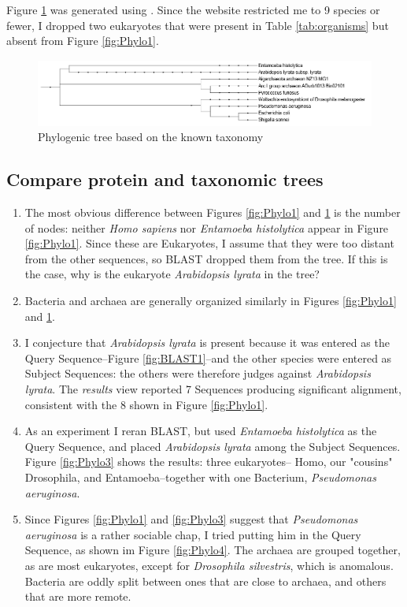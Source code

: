 \documentclass[]{article}
\begin{document}
Figure \ref{fig:Phylo2} was generated using \cite{biobyte2019phylot}. Since the website restricted me to 9 species or fewer, I dropped two eukaryotes that were present in Table \ref{tab:organisms} but absent from Figure \ref{fig:Phylo1}.

\begin{figure}[H]
	\caption{Phylogenic tree based on the known taxonomy}\label{fig:Phylo2}
	\includegraphics[width=\textwidth]{Phylo2}
\end{figure}

\subsection{Compare protein and taxonomic trees}\label{sect:compare}

\begin{enumerate}
	\item The most obvious difference between Figures \ref{fig:Phylo1} and  \ref{fig:Phylo2} is the number of nodes: neither \textit{Homo sapiens} nor \textit{Entamoeba histolytica} appear in Figure \ref{fig:Phylo1}. Since these are Eukaryotes, I assume that they were too distant from the other sequences, so BLAST dropped them from the tree. If this is the case, why is the eukaryote \textit{Arabidopsis lyrata} in the tree?
	\item Bacteria and archaea are generally organized similarly in  Figures \ref{fig:Phylo1} and  \ref{fig:Phylo2}.
	\item I conjecture that \textit{Arabidopsis lyrata} is present because it was entered as the Query Sequence--Figure \ref{fig:BLAST1}--and the other species were entered as Subject Sequences: the others were therefore judges against \textit{Arabidopsis lyrata}. The \textit{results} view reported 7 Sequences producing significant alignment, consistent with the 8 shown in Figure \ref{fig:Phylo1}.
	\item As an experiment I reran BLAST, but used \textit{Entamoeba histolytica } as the Query Sequence, and placed \textit{Arabidopsis lyrata} among the Subject Sequences. Figure \ref{fig:Phylo3} shows the results: three eukaryotes-- Homo, our "cousins" Drosophila, and Entamoeba--together with one Bacterium, \textit{Pseudomonas aeruginosa}. 
	\item Since Figures \ref{fig:Phylo1} and \ref{fig:Phylo3} suggest that \textit{Pseudomonas aeruginosa} is a rather sociable chap, I tried putting him in the Query Sequence, as shown im Figure \ref{fig:Phylo4}. The archaea are grouped together, as are most eukaryotes, except for \textit{Drosophila silvestris}, which is anomalous. Bacteria are oddly split between ones that are close to archaea, and others that are more remote.
\end{enumerate}
\end{document}
